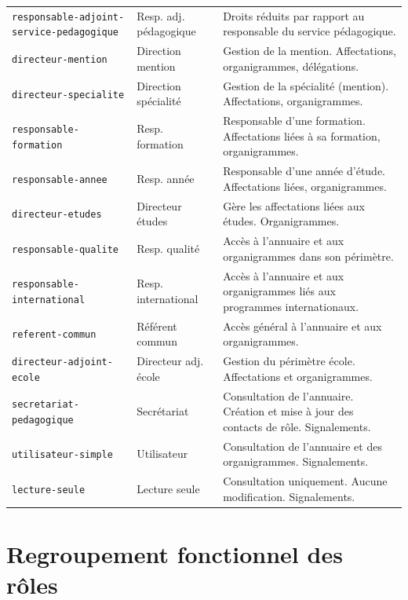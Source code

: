 \begin{longtable}{L{4.5cm}L{3cm}X}
  \texttt{responsable-adjoint-service-pedagogique} & Resp. adj. p\'edagogique
    & Droits r\'eduits par rapport au responsable du service p\'edagogique. \\
  \texttt{directeur-mention} & Direction mention
    & Gestion de la mention. Affectations, organigrammes, d\'el\'egations. \\
  \texttt{directeur-specialite} & Direction sp\'ecialit\'e
    & Gestion de la sp\'ecialit\'e (mention). Affectations, organigrammes. \\
  \texttt{responsable-formation} & Resp. formation
    & Responsable d'une formation. Affectations li\'ees \`a sa formation, organigrammes. \\
  \texttt{responsable-annee} & Resp. ann\'ee
    & Responsable d'une ann\'ee d'\'etude. Affectations li\'ees, organigrammes. \\
  \texttt{directeur-etudes} & Directeur \'etudes
    & G\`ere les affectations li\'ees aux \'etudes. Organigrammes. \\
  \texttt{responsable-qualite} & Resp. qualit\'e
    & Acc\`es \`a l'annuaire et aux organigrammes dans son p\'erim\`etre. \\
  \texttt{responsable-international} & Resp. international
    & Acc\`es \`a l'annuaire et aux organigrammes li\'es aux programmes internationaux. \\
  \texttt{referent-commun} & R\'ef\'erent commun
    & Acc\`es g\'en\'eral \`a l'annuaire et aux organigrammes. \\
  \texttt{directeur-adjoint-ecole} & Directeur adj. \'ecole
    & Gestion du p\'erim\`etre \'ecole. Affectations et organigrammes. \\
  \texttt{secretariat-pedagogique} & Secr\'etariat
    & Consultation de l'annuaire. Cr\'eation et mise \`a jour des contacts de r\^ole. Signalements. \\
  \texttt{utilisateur-simple} & Utilisateur
    & Consultation de l'annuaire et des organigrammes. Signalements. \\
  \texttt{lecture-seule} & Lecture seule
    & Consultation uniquement. Aucune modification. Signalements. \\

\end{longtable}

\section{Regroupement fonctionnel des r\^oles}

